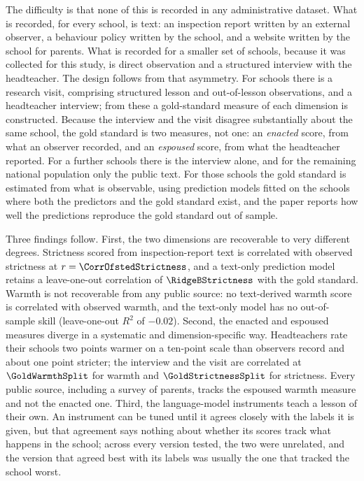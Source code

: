 The difficulty is that none of this is recorded in any administrative
dataset. What is recorded, for every school, is text: an inspection report
written by an external observer, a behaviour policy written by the school, and
a website written by the school for parents. What is recorded for a smaller
set of schools, because it was collected for this study, is direct observation
and a structured interview with the headteacher. The design follows from that
asymmetry. For \NTierOne{} schools there is a research visit, comprising
structured lesson and out-of-lesson observations, and a headteacher interview;
from these a gold-standard measure of each dimension is constructed. Because
the interview and the visit disagree substantially about the same school, the
gold standard is two measures, not one: an \emph{enacted} score, from what an
observer recorded, and an \emph{espoused} score, from what the headteacher
reported. For a further \NTierTwo{} schools there is the interview alone, and
for the remaining national population only the public text. For those schools
the gold standard is estimated from what is observable, using prediction
models fitted on the schools where both the predictors and the gold standard
exist, and the paper reports how well the predictions reproduce the gold
standard out of sample.

Three findings follow. First, the two dimensions are recoverable to very
different degrees. Strictness scored from inspection-report text is
correlated with observed strictness at $r = \CorrOfstedStrictness$, and a
text-only prediction model retains a leave-one-out correlation of
$\RidgeBStrictness$ with the gold standard. Warmth is not recoverable from
any public source: no text-derived warmth score is correlated with observed
warmth, and the text-only model has no out-of-sample skill (leave-one-out
$R^2$ of $-0.02$). Second, the enacted and espoused measures diverge in a
systematic and dimension-specific way. Headteachers rate their schools two
points warmer on a ten-point scale than observers record and about one point
stricter; the interview and the visit are correlated at $\GoldWarmthSplit$ for
warmth and $\GoldStrictnessSplit$ for strictness. Every public source,
including a survey of parents, tracks the espoused warmth measure and not the
enacted one. Third, the language-model instruments teach a lesson of their
own. An instrument can be tuned until it agrees closely with the labels it is
given, but that agreement says nothing about whether its scores track what
happens in the school; across every version tested, the two were unrelated,
and the version that agreed best with its labels was usually the one that
tracked the school worst.

